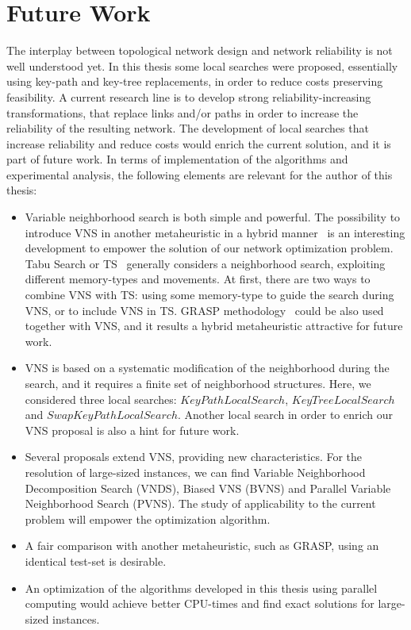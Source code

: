 \chapter{Future Work}\label{future}
The interplay between topological network design and network reliability is not well understood yet. 
In this thesis some local searches were proposed, essentially using key-path and key-tree replacements, in order to reduce costs preserving feasibility. A current research line is to develop strong reliability-increasing transformations, that  replace links and/or paths in order to increase the reliability of the resulting network. The development of local searches that increase reliability and reduce costs would enrich the current solution, and it is part of future work. In terms of implementation of the algorithms and experimental analysis, the following elements 
are relevant for the author of this thesis:  
\begin{itemize}
\item Variable neighborhood search is both simple and powerful. The possibility to introduce VNS in another 
metaheuristic in a hybrid manner~\cite{16,17} is an interesting development to empower the solution of our network optimization problem. Tabu Search or TS~\cite{5,15,59} generally considers a neighborhood search, exploiting different 
memory-types and movements. At first, there are two ways to combine VNS with TS: using some memory-type to 
guide the search during VNS, or to include VNS in TS. GRASP methodology~\cite{2,3,5,6,51,11} could be also used 
together with VNS, and it results a hybrid metaheuristic attractive for future work.
\item VNS is based on a systematic modification of the neighborhood during the search, and 
it requires a finite set of neighborhood structures. Here, we considered three local searches: 
$KeyPathLocalSearch$, $KeyTreeLocalSearch$ and $SwapKeyPathLocalSearch$. Another local search in order to 
enrich our VNS proposal is also a hint for future work.
\item Several proposals extend VNS, providing new characteristics. For the resolution of large-sized 
instances, we can find Variable Neighborhood Decomposition Search (VNDS), Biased VNS (BVNS) and Parallel 
Variable Neighborhood Search (PVNS). The study of applicability to the current problem will empower the optimization algorithm. 
\item A fair comparison with another metaheuristic, such as GRASP, using an identical test-set is desirable.  
\item An optimization of the algorithms developed in this thesis using parallel computing would achieve better CPU-times and find exact solutions for large-sized instances.
\end{itemize}